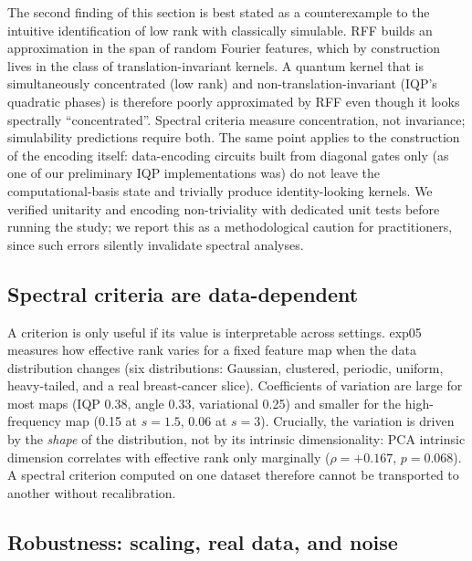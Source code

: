 \documentclass[a4paper,unpublished,onecolumn,nopdfoutputerror,12pt]{quantumarticle}
\begin{document}
The second finding of this section is best stated as a counterexample to the intuitive
identification of low rank with classically simulable. RFF builds an approximation in
the span of random Fourier features, which by construction lives in the class of
translation-invariant kernels. A quantum kernel that is simultaneously concentrated (low
rank) and non-translation-invariant (IQP's quadratic phases) is therefore poorly
approximated by RFF even though it looks spectrally ``concentrated''. Spectral criteria
measure concentration, not invariance; simulability predictions require both. The same
point applies to the construction of the encoding itself: data-encoding circuits built
from diagonal gates only (as one of our preliminary IQP implementations was) do not
leave the computational-basis state and trivially produce identity-looking kernels.
We verified unitarity and encoding non-triviality with dedicated unit tests before
running the study; we report this as a methodological caution for practitioners, since
such errors silently invalidate spectral analyses.

\subsection{Spectral criteria are data-dependent}
\label{sec:datadep}

A criterion is only useful if its value is interpretable across settings. exp05 measures
how effective rank varies for a fixed feature map when the data distribution changes
(six distributions: Gaussian, clustered, periodic, uniform, heavy-tailed, and a real
breast-cancer slice). Coefficients of variation are large for most maps (IQP 0.38,
angle 0.33, variational 0.25) and smaller for the high-frequency map (0.15 at $s=1.5$,
0.06 at $s=3$). Crucially, the variation is driven by the \emph{shape} of the
distribution, not by its intrinsic dimensionality: PCA intrinsic dimension correlates
with effective rank only marginally ($\rho=+0.167$, $p=0.068$). A spectral criterion
computed on one dataset therefore cannot be transported to another without recalibration.

\subsection{Robustness: scaling, real data, and noise}
\label{sec:robustness}
\end{document}
